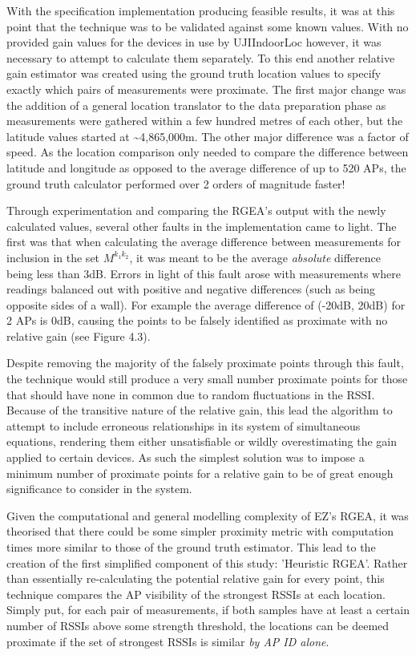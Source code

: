 \documentclass{UoYCSproject}
\begin{document}
            With the specification implementation producing feasible results, it was at this point that the technique was to be validated against some known values. With no provided gain values for the devices in use by UJIIndoorLoc however, it was necessary to attempt to calculate them separately. To this end another relative gain estimator was created using the ground truth location values to specify exactly which pairs of measurements were proximate. The first major change was the addition of a general location translator to the data preparation phase as measurements were gathered within a few hundred metres of each other, but the latitude values started at \textasciitilde4,865,000m. The other major difference was a factor of speed. As the location comparison only needed to compare the difference between latitude and longitude as opposed to the average difference of up to 520 APs, the ground truth calculator performed over 2 orders of magnitude faster!
            
            Through experimentation and comparing the RGEA's output with the newly calculated values, several other faults in the implementation came to light. The first was that when calculating the average difference between measurements for inclusion in the set $M^{k_1k_2}$, it was meant to be the average \emph{absolute} difference being less than 3dB. Errors in light of this fault arose with measurements where readings balanced out with positive and negative differences (such as being opposite sides of a wall). For example the average difference of (-20dB, 20dB) for 2 APs is $0$dB, causing the points to be falsely identified as proximate with no relative gain (see Figure 4.3).
            
            Despite removing the majority of the falsely proximate points through this fault, the technique would still produce a very small number proximate points for those that should have none in common due to random fluctuations in the RSSI. Because of the transitive nature of the relative gain, this lead the algorithm to attempt to include erroneous relationships in its system of simultaneous equations, rendering them either unsatisfiable or wildly overestimating the gain applied to certain devices. As such the simplest solution was to impose a minimum number of proximate points for a relative gain to be of great enough significance to consider in the system.
            
            Given the computational and general modelling complexity of EZ's RGEA, it was theorised that there could be some simpler proximity metric with computation times more similar to those of the ground truth estimator. This lead to the creation of the first simplified component of this study: 'Heuristic RGEA'. Rather than essentially re-calculating the potential relative gain for every point, this technique compares the AP visibility of the strongest RSSIs at each location. Simply put, for each pair of measurements, if both samples have at least a certain number of RSSIs above some strength threshold, the locations can be deemed proximate if the set of strongest RSSIs is similar \emph{by AP ID alone}.
            
\end{document}
